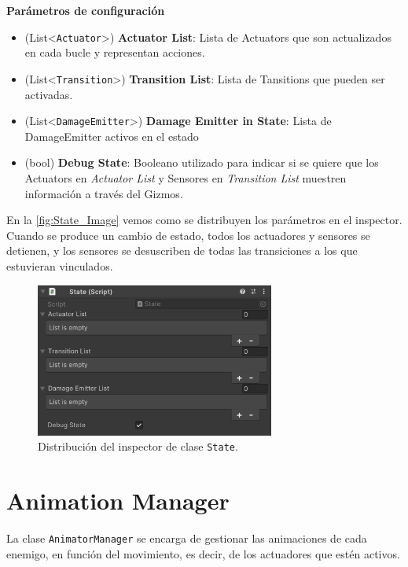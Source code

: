 \textbf{Parámetros de configuración}
\begin{itemize}
	\item (List<\texttt{Actuator}>) \textbf{Actuator List}: Lista de Actuators que son actualizados en cada bucle y representan acciones.
	\item (List<\texttt{Transition}>) \textbf{Transition List}: Lista de Tansitions que pueden ser activadas.
	\item (List<\texttt{DamageEmitter}>) \textbf{Damage Emitter in State}: Lista de DamageEmitter activos en el estado
	\item (bool) \textbf{Debug State}: Booleano utilizado para indicar si se quiere que los Actuators en \textit{Actuator List} y Sensores en \textit{Transition List} muestren información a través del Gizmos.
\end{itemize}

En la \autoref{fig:State_Image} vemos como se distribuyen los parámetros en el inspector.\\

Cuando se produce un cambio de estado, todos los actuadores y sensores se detienen, y los sensores se desuscriben de todas las transiciones a los que estuvieran vinculados.\\
\begin{figure}[t]
		\centering
		\includegraphics[width = 0.7\textwidth]{Imagenes/State.png}
		\caption{Distribución del inspector de clase \texttt{State}.}
		\label{fig:State_Image}
\end{figure}
\section{Animation Manager}
La clase \texttt{AnimatorManager} se encarga de gestionar las animaciones de cada enemigo, en función del movimiento, es decir, de los actuadores que estén activos.\\

